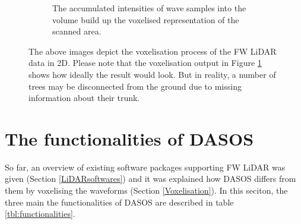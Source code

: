 \documentclass{subfiles}
\begin{document}
\begin{figure} [h!]
\begin{subfigure}[t]{.31\textwidth}
				\caption{The accumulated intensities of wave samples into the volume build up the voxelised representation of the scanned area.} 
				\label{fig:VoxelisationC_voxelised}
			\end{subfigure}
			\caption[Voxelisation of FW LiDAR data]{The above images depict the voxelisation process of the FW LiDAR data in 2D. Please note that the voxelisation output in Figure \ref{fig:VoxelisationC_voxelised} shows how ideally the result would look. But in reality, a number of trees may be disconnected from the ground due to missing information about their trunk.} %
			\label{fig:Voxelisation} 
		\end{figure}
		
	
			
		
	\section{The functionalities of DASOS}\label{DASOS}
	
		\par So far, an overview of existing software packages supporting FW LiDAR was given (Section \ref{LiDARsoftwares}) and it was explained how DASOS differs from them by voxelising the waveforms (Section \ref{Voxelisation}). In this seciton, the three main the functionalities of DASOS are described in table \ref{tbl:functionalities}.
		\newpage
     
\end{document}

